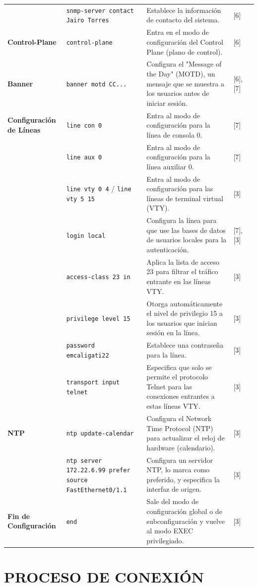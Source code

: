 \documentclass[a5paper]{book}%
\begin{document}
\begin{longtable}{|p{2cm}|p{3cm}|p{4cm}|p{2cm}|p{2cm}|}
& \texttt{snmp-server contact Jairo Torres} & Establece la información de contacto del sistema. & [6] \\
\textbf{Control-Plane} & \texttt{control-plane} & Entra en el modo de configuración del Control Plane (plano de control). & [6] \\
\textbf{Banner} & \texttt{banner motd \textvisiblespace CC... \textvisiblespace} & Configura el "Message of the Day" (MOTD), un mensaje que se muestra a los usuarios antes de iniciar sesión. & [6], [7] \\
\textbf{Configuración de Líneas} & \texttt{line con 0} & Entra al modo de configuración para la línea de consola 0. & [7] \\
& \texttt{line aux 0} & Entra al modo de configuración para la línea auxiliar 0. & [7] \\
& \texttt{line vty 0 4} / \texttt{line vty 5 15} & Entra al modo de configuración para las líneas de terminal virtual (VTY). & [3] \\
& \texttt{login local} & Configura la línea para que use las bases de datos de usuarios locales para la autenticación. & [7], [3] \\
& \texttt{access-class 23 in} & Aplica la lista de acceso 23 para filtrar el tráfico entrante en las líneas VTY. & [3] \\
& \texttt{privilege level 15} & Otorga automáticamente el nivel de privilegio 15 a los usuarios que inician sesión en la línea. & [3] \\
& \texttt{password emcaligati22} & Establece una contraseña para la línea. & [3] \\
& \texttt{transport input telnet} & Especifica que solo se permite el protocolo Telnet para las conexiones entrantes a estas líneas VTY. & [3] \\
\textbf{NTP} & \texttt{ntp update-calendar} & Configura el Network Time Protocol (NTP) para actualizar el reloj de hardware (calendario). & [3] \\
& \texttt{ntp server 172.22.6.99 prefer source FastEthernet0/1.1} & Configura un servidor NTP, lo marca como preferido, y especifica la interfaz de origen. & [3] \\
\textbf{Fin de Configuración} & \texttt{end} & Sale del modo de configuración global o de subconfiguración y vuelve al modo EXEC privilegiado. & [3] \\
\hline
\end{longtable}
    
\chapter{PROCESO DE CONEXIÓN}
\end{document}
